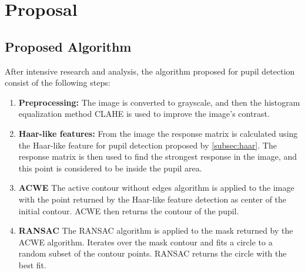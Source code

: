 \chapter{Proposal}
\label{chap:proposal}
\section{Proposed Algorithm}
After intensive research and analysis, the algorithm proposed for pupil detection consist of the following steps: 
\begin{enumerate}
    \item \textbf{Preprocessing:} The image is converted to grayscale, and then the histogram equalization method CLAHE is used to improve the image's contrast.
    \item \textbf{Haar-like features:} From the image the response matrix is calculated using the Haar-like feature for pupil detection proposed by \ref{subsec:haar}. The response matrix is then used to find the strongest response in the image, and this point is considered to be inside the pupil area. 
    \item \textbf{ACWE} The active contour without edges algorithm is applied to the image with the point returned by the Haar-like feature detection as center of the initial contour. ACWE then returns the contour of the pupil.
    \item \textbf{RANSAC} The RANSAC algorithm is applied to the mask returned by the ACWE algorithm. Iterates over the mask contour and fits a circle to a random subset of the contour points. RANSAC returns the circle with the best fit.
\end{enumerate}